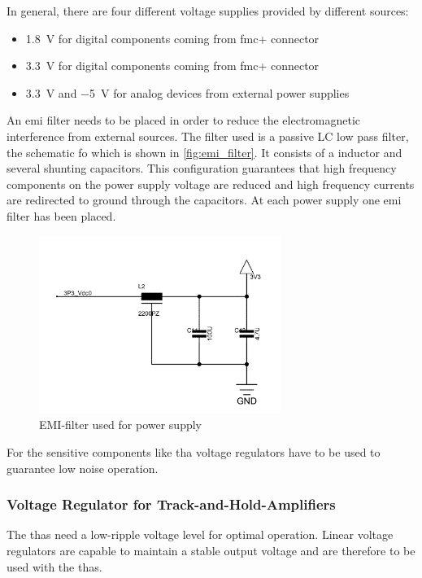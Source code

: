 In general, there are four different voltage supplies provided by different sources:
\begin{itemize}
	\item \SI{1.8}{\volt} for digital components coming from \gls{fmc}+ connector
	\item \SI{3.3}{\volt} for digital components coming from \gls{fmc}+ connector
	\item \SI{3.3}{\volt} and \SI{-5}{\volt} for analog devices from external power supplies 
\end{itemize}
An \gls{emi} filter needs to be placed in order to reduce the electromagnetic interference from external sources. 
The filter used is a passive LC low pass filter, the schematic fo which is shown in \autoref{fig:emi_filter}.
It consists of a inductor and several shunting capacitors.
This configuration guarantees that high frequency components on the power supply voltage are reduced and high frequency currents are redirected to ground through the capacitors.
At each power supply one \gls{emi} filter has been placed. 
\begin{figure}[tbh]
	\centering
	\includegraphics[width = 0.7\textwidth]{chap/04-theresa/img/schematic/emi_filter}
	\caption{EMI-filter used for power supply}
	\label{fig:emi_filter}
\end{figure}
For the sensitive components like \gls{tha} voltage regulators have to be used to guarantee low noise operation.


\subsubsection*{Voltage Regulator for Track-and-Hold-Amplifiers}
The \glspl{tha} need a low-ripple voltage level for optimal operation. 
Linear voltage regulators are capable to maintain a stable output voltage and are therefore to be used with the \glspl{tha}.

